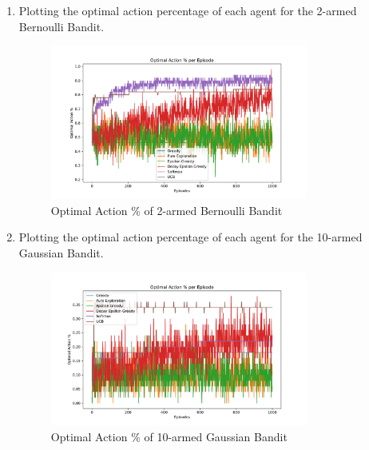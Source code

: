 \begin{enumerate}
    \item Plotting the optimal action percentage of each agent for the 2-armed Bernoulli Bandit.
    \begin{figure}[h]
        \centering
        \includegraphics[width=0.8\textwidth]{images/mab/bernoulli_optimal_actions_percentage_per_episode.pdf}
        \caption{Optimal Action \% of 2-armed Bernoulli Bandit}
        \label{fig:bernoulli_optimal_action}
    \end{figure}

    \item Plotting the optimal action percentage of each agent for the 10-armed Gaussian Bandit.
    \begin{figure}[h]
        \centering
        \includegraphics[width=0.8\textwidth]{images/mab/10_arm_gaussian_optimal_actions_percentage_per_episode.pdf}
        \caption{Optimal Action \% of 10-armed Gaussian Bandit}
        \label{fig:gaussian_optimal_action}
    \end{figure}

\end{enumerate}